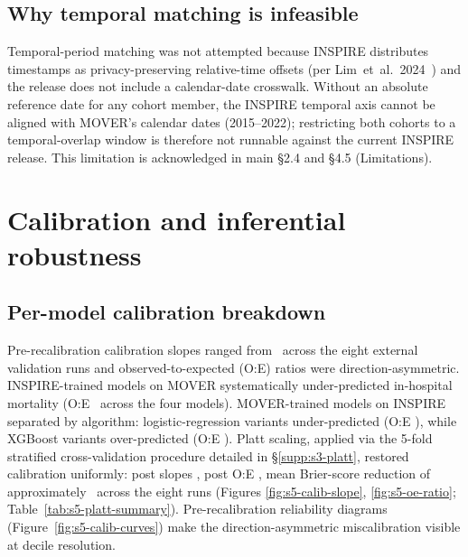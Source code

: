 \documentclass[11pt,a4paper]{article}
\begin{document}
\subsection{Why temporal matching is infeasible}\label{supp:s4-temporal}

Temporal-period matching was not attempted because INSPIRE distributes
timestamps as privacy-preserving relative-time offsets (per
Lim~et~al.~2024~\cite{Lim2024}) and the release does not include a
calendar-date crosswalk. Without an absolute reference date for any cohort
member, the INSPIRE temporal axis cannot be aligned with MOVER's calendar
dates (2015--2022); restricting both cohorts to a temporal-overlap window is
therefore not runnable against the current INSPIRE release. This limitation
is acknowledged in main \S2.4 and \S4.5 (Limitations).


\section{Calibration and inferential robustness}\label{supp:s5-calibration-robustness}

\subsection{Per-model calibration breakdown}\label{supp:s5-per-model}

Pre-recalibration calibration slopes ranged from \pnCalibSlopePreRangeFull\
across the eight external validation runs and observed-to-expected (O:E)
ratios were direction-asymmetric. INSPIRE-trained models on MOVER
systematically under-predicted in-hospital mortality (O:E
\pnOERatioInspireTrainedPreRange\ across the four models). MOVER-trained
models on INSPIRE separated by algorithm: logistic-regression variants
under-predicted (O:E \pnOERatioMoverTrainedPreRangeLR), while XGBoost
variants over-predicted (O:E \pnOERatioMoverTrainedPreRangeXGB). Platt
scaling, applied via the 5-fold stratified cross-validation procedure
detailed in \S\ref{supp:s3-platt}, restored calibration uniformly: post
slopes \pnCalibSlopePostRangeFull, post O:E
\pnOERatioPostRangeFull, mean Brier-score reduction of approximately
\pnBrierMeanImprovementPct\ across the eight runs (Figures
\ref{fig:s5-calib-slope}, \ref{fig:s5-oe-ratio};
Table~\ref{tab:s5-platt-summary}). Pre-recalibration reliability diagrams
(Figure~\ref{fig:s5-calib-curves}) make the direction-asymmetric
miscalibration visible at decile resolution.
\end{document}
